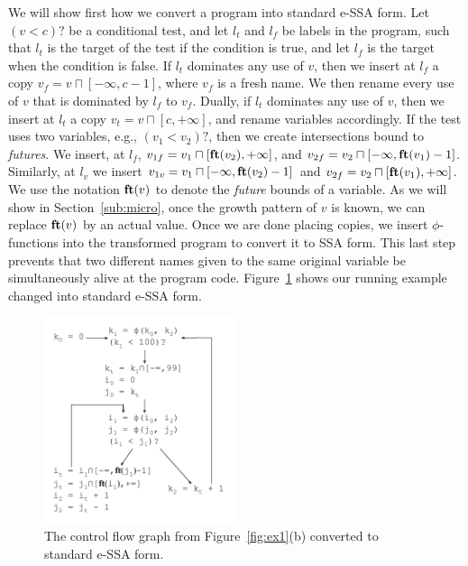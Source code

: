 \documentclass{llncs}
\newcommand{\fun}[1]{\mbox{\textbf{#1}}}
\begin{document}
We will show first how we convert a program into standard e-SSA form.
Let $(v < c)?$ be a conditional test, and let $l_t$ and $l_f$ be labels in
the program, such that $l_t$ is the target of the test if the condition is true,
and let $l_f$ is the target when the condition is false.
If $l_t$ dominates any use of $v$, then we insert at $l_f$ a copy
$v_f = v \sqcap [-\infty, c-1]$, where $v_f$ is a fresh name.
We then rename every use of $v$ that is dominated by $l_f$ to $v_f$.
Dually, if $l_t$ dominates any use of $v$, then we insert at $l_t$ a copy
$v_t = v \sqcap [c, +\infty]$, and rename variables accordingly.
If the test uses two variables, e.g., $(v_1 < v_2)?$, then we create
intersections bound to {\em futures}.
We insert, at $l_f$, $v_{1f} = v_1 \sqcap [\fun{ft}(v_2), +\infty]$,
and $v_{2f} = v_2 \sqcap [-\infty, \fun{ft}(v_1) - 1]$.
Similarly, at $l_v$ we insert
$v_{1v} = v_1 \sqcap [-\infty, \fun{ft}(v_2) - 1]$
and $v_{2f} = v_2 \sqcap [\fun{ft}(v_1), +\infty]$.
We use the notation $\fun{ft}(v)$ to denote the {\em future} bounds of a
variable.
As we will show in Section~\ref{sub:micro}, once the growth pattern of $v$ is
known, we can replace $\fun{ft}(v)$ by an actual value.
Once we are done placing copies, we insert $\phi$-functions into the
transformed program to convert it to SSA form.
This last step prevents that two different names given to the same original
variable be simultaneously alive at the program code.
Figure~\ref{fig:ex_standard_eSSA} shows our running example changed into
standard e-SSA form.

\begin{figure}[t!]
\begin{center}
\includegraphics[width=0.5\textwidth]{images/ex_standard_eSSA}
\end{center}
\caption{\label{fig:ex_standard_eSSA}
The control flow graph from Figure~\ref{fig:ex1}(b) converted to standard
e-SSA form.}
\end{figure}
\end{document}
